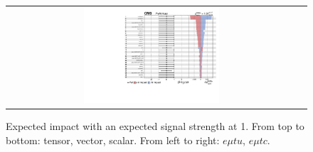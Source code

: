 \begin{figure}[tbh!]
\begin{center}
\begin{tabular}{cc}
  \includegraphics[width=0.48\textwidth]{figures/Appendix/Impact/Impact_ScalarC_expected}\\
 \end{tabular}
 \caption{Expected impact with an expected signal strength at 1. From top to bottom: tensor, vector, scalar. From left to right: $e\mu tu$, $e\mu tc$.}
 \label{fig:Impact2}
 \end{center}
\end{figure}
